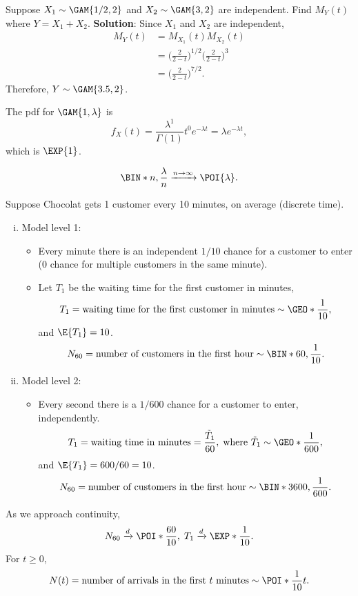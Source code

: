 \begin{Example}{}{}
    Suppose $ X_1 \sim \GAM{1/2,2} $ and $ X_2 \sim \GAM{3,2} $ are independent.
    Find $ M_Y(t) $ where $ Y=X_1+X_2 $.
    \tcblower{}
    \textbf{Solution}: Since $ X_1 $ and $ X_2 $ are independent,
    \begin{align*}
        M_Y(t)
         & =M_{X_1}(t)M_{X_2}(t)                                             \\
         & =\biggl(\frac{2}{2-t}\biggr)^{1/2}\biggl(\frac{2}{2-t}\biggr)^{3} \\
         & =\biggl(\frac{2}{2-t}\biggr)^{7/2}.
    \end{align*}
    Therefore, $ Y \sim \GAM{3.5,2} $.
\end{Example}
\begin{Example}{}{}
    The pdf for $ \GAM{1,\lambda} $ is
    \[ f_X(t)=\frac{\lambda^1}{\Gamma(1)}t^0 e^{-\lambda t}=\lambda e^{-\lambda t}, \]
    which is $ \EXP{1} $.
\end{Example}
\begin{Remark}{}{}
    \[ \BIN*{n,\frac{\lambda}{n}}\xrightarrow{n\to\infty} \POI{\lambda}. \]
\end{Remark}
\begin{Example}{}{}
    Suppose Chocolat gets 1 customer every 10 minutes, on average (discrete time).
    \begin{enumerate}[(i)]
        \item Model level 1:
              \begin{itemize}
                  \item Every minute there is an independent $ 1/10 $ chance for a customer to enter
                        ($0$ chance for multiple customers in the same minute).
                  \item Let $ T_1 $ be the waiting time for the first customer in minutes,
                        \[ T_1=\text{waiting time for the first customer in minutes}\sim \GEO*{\frac{1}{10}}, \]
                        and $ \E{T_1}=10 $.
                        \[ N_{60}=\text{number of customers in the first hour}\sim \BIN*{60,\frac{1}{10}}. \]
              \end{itemize}
        \item Model level 2:
              \begin{itemize}
                  \item Every second there is a $ 1/600 $ chance for a customer to enter, independently.
                        \[ T_1=\text{waiting time in minutes}=\frac{\tilde{T}_1}{60},\; \text{where }\tilde{T}_1 \sim \GEO*{\frac{1}{600}}, \]
                        and $ \E{T_1}=600/60=10 $.
                        \[ N_{60}=\text{number of customers in the first hour}\sim \BIN*{3600,\frac{1}{600}}. \]
              \end{itemize}
    \end{enumerate}
    As we approach continuity,
    \[ N_{60}\tod\POI*{\frac{60}{10}},\;
        T_1\tod\EXP*{\frac{1}{10}}. \]
    For $ t\ge 0 $,
    \[ N(t)=\text{number of arrivals in the first $t$ minutes}\sim \POI*{\frac{1}{10}t}. \]
\end{Example}
